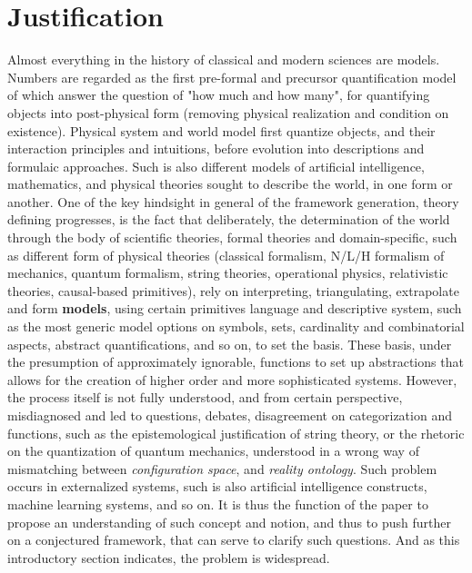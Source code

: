 \section{Justification}

Almost everything in the history of classical and modern sciences are models. Numbers are regarded as the first pre-formal and precursor quantification model of which answer the question of "how much and how many", for quantifying objects into post-physical form (removing physical realization and condition on existence). Physical system and world model first quantize objects, and their interaction principles and intuitions, before evolution into descriptions and formulaic approaches. Such is also different models of artificial intelligence, mathematics, and physical theories sought to describe the world, in one form or another. One of the key hindsight in general of the framework generation, theory defining progresses, is the fact that deliberately, the determination of the world through the body of scientific theories, formal theories and domain-specific, such as different form of physical theories (classical formalism, N/L/H formalism of mechanics, quantum formalism, string theories, operational physics, relativistic theories, causal-based primitives), rely on interpreting, triangulating, extrapolate and form \textbf{models}, using certain primitives language and descriptive system, such as the most generic model options on symbols, sets, cardinality and combinatorial aspects, abstract quantifications, and so on, to set the basis. These basis, under the presumption of approximately ignorable, functions to set up abstractions that allows for the creation of higher order and more sophisticated systems. However, the process itself is not fully understood, and from certain perspective, misdiagnosed and led to questions, debates, disagreement on categorization and functions, such as the epistemological justification of string theory, or the rhetoric on the quantization of quantum mechanics, understood in a wrong way of mismatching between \textit{configuration space}, and \textit{reality ontology}. Such problem occurs in externalized systems, such is also artificial intelligence constructs, machine learning systems, and so on. It is thus the function of the paper to propose an understanding of such concept and notion, and thus to push further on a conjectured framework, that can serve to clarify such questions. And as this introductory section indicates, the problem is widespread. 


